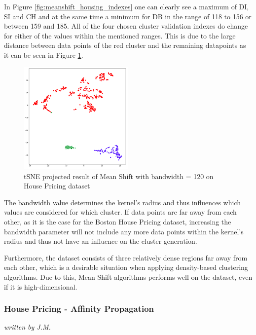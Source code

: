 In Figure \ref{fig:meanshift_housing_indexes} one can clearly see a maximum of DI, SI and CH and at the same time a minimum for DB in the range of 118 to 156 or between 159 and 185. All of the four chosen cluster validation indexes do change for either of the values within the mentioned ranges. This is due to the large distance between data points of the red cluster and the remaining datapoints as it can be seen in Figure \ref{fig:meanshift_housing_120}.

\begin{figure}[!ht]
\caption{tSNE projected result of Mean Shift with bandwidth = 120 on House Pricing dataset}
\begin{center}
\includegraphics[width=0.5\textwidth]{images/Meanshift_Housing_120.png}
\end{center}
\label{fig:meanshift_housing_120}
\end{figure}

The bandwidth value determines the kernel's radius and thus influences which values are considered for which cluster. If data points are far away from each other, as it is the case for the Boston House Pricing dataset, increasing the bandwidth parameter will not include any more data points within the kernel's radius and thus not have an influence on the cluster generation. 

Furthermore, the dataset consists of three relatively dense regions far away from each other, which is a desirable situation when applying density-based clustering algorithms. Due to this, Mean Shift algorithms performs well on the dataset, even if it is high-dimensional.

\subsubsection{House Pricing - Affinity Propagation}
\textit{written by J.M.}\\

